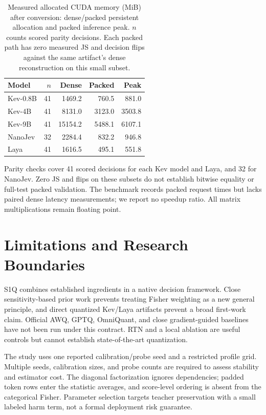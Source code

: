 \documentclass[10pt,twocolumn]{article}
\begin{document}
\begin{table}[t]
\centering\footnotesize
\setlength{\tabcolsep}{3pt}
\begin{tabular}{lrrrr}
\toprule
Model & $n$ & Dense & Packed & Peak\\
\midrule
Kev-0.8B & 41 & 1469.2 & 760.5 & 881.0 \\
Kev-4B & 41 & 8131.0 & 3123.0 & 3503.8 \\
Kev-9B & 41 & 15154.2 & 5488.1 & 6107.1 \\
NanoJev & 32 & 2284.4 & 832.2 & 946.8 \\
Laya & 41 & 1616.5 & 495.1 & 551.8 \\
\bottomrule
\end{tabular}
\caption{Measured allocated CUDA memory (MiB) after conversion:
dense/packed persistent allocation and packed inference peak.
$n$ counts scored parity decisions. Each packed path has zero measured
JS and decision flips against the same artifact's dense reconstruction
on this small subset.}
\label{tab:runtime}
\end{table}

Parity checks cover 41 scored decisions for each Kev model and Laya,
and 32 for NanoJev. Zero JS and flips on these subsets do not establish
bitwise equality or full-test packed validation.
The benchmark records packed request times but lacks paired dense
latency measurements; we report no speedup ratio. All matrix
multiplications remain floating point.

\section{Limitations and Research Boundaries}
S1Q combines established ingredients in a native decision framework.
Close sensitivity-based prior work prevents treating Fisher weighting
as a new general principle, and direct quantized Kev/Laya artifacts
prevent a broad first-work claim. Official AWQ, GPTQ, OmniQuant, and
close gradient-guided baselines have not been run under this contract.
RTN and a local ablation are useful controls but cannot establish
state-of-the-art quantization.

The study uses one reported calibration/probe seed and a restricted
profile grid. Multiple seeds, calibration sizes, and probe counts
are required to assess stability and estimator cost.
The diagonal factorization ignores dependencies; padded token rows
enter the statistic averages, and score-level ordering is absent
from the categorical Fisher. Parameter selection targets teacher
preservation with a small labeled harm term, not a formal deployment
risk guarantee.
\end{document}
